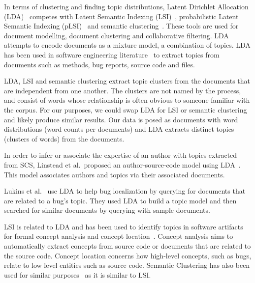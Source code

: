 \documentclass[times, 10pt,twocolumn]{article}
\newcommand{\shrinkit}{\vspace*{-.3em}}
\begin{document}

In terms of clustering and finding topic distributions, Latent
Dirichlet Allocation (LDA)~\cite{944937} competes with Latent Semantic
Indexing
(LSI)~\cite{1374321-short,10.1109/ICPC.2007.13-short},
probabilistic Latent Semantic Indexing (pLSI)~\cite{944937} and
semantic clustering~\cite{1698774-short,1566153-short}. These tools are used for
document modelling, document clustering and collaborative
filtering. LDA attempts to encode documents as a mixture
model, a combination of topics.  LDA has been used in software engineering
literature~\cite{lukins2008-short,10.1109/MSR.2007.20-short}%
to extract topics from documents such as methods, bug
reports, source code and files.

LDA, LSI and semantic clustering extract topic
clusters from the documents that are independent from one another. 
The clusters are not named by the process, and consist of
words whose
relationship is often obvious to someone familiar with the corpus. For our purposes, we
could swap LDA for LSI or semantic clustering and likely produce similar
results. Our data is posed as documents with word distributions (word
counts per documents) and LDA extracts distinct topics (clusters of
words) from the documents.

\shrinkit
{}
\shrinkit




In order to infer or associate the expertise of an author with topics
extracted from SCS, Linstead et al.\  proposed an author-source-code model
using LDA~\cite{10.1109/MSR.2007.20-short}.%
This model associates authors and topics via their associated documents.


Lukins et al.~\cite{lukins2008-short} use LDA to help bug
localization by querying for documents that are related to a bug's
topic. They used LDA to build a topic model and then searched for
similar documents by querying with sample documents.

LSI is related to LDA and has been used to identify topics in software
artifacts for formal concept analysis and concept
location~\cite{1374321-short,10.1109/ICPC.2007.13-short}.
Concept analysis aims to automatically extract concepts from source
code or documents that are related to the source code.  Concept location concerns how
high-level concepts, such as bugs, relate to low level entities such as source code. 
Semantic Clustering has also been
used for similar purposes~\cite{1698774-short,1566153-short} as it is similar to
LSI.
\end{document}
